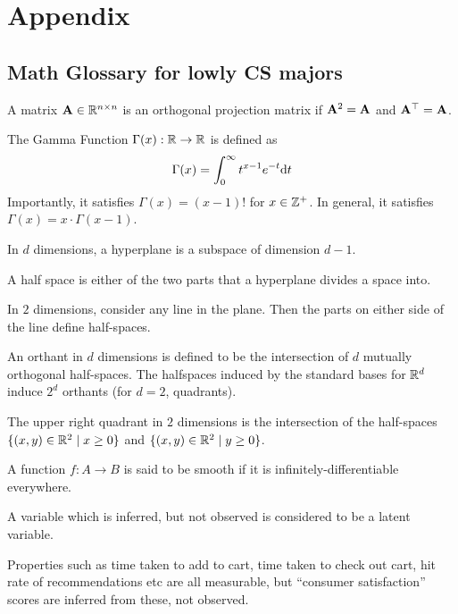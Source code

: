 \section{Appendix}
\subsection{Math Glossary for lowly CS majors}
\begin{defn}
A matrix $\mathbf{A} \in \mathbb{R}^{n \times n}$ is an orthogonal projection matrix if $\mathbf{A}^2 = \mathbf{A}$ and $\mathbf{A}^\top = \mathbf{A}$.
\end{defn}
\begin{defn}
The Gamma Function $\Gamma(x): \mathbb{R} \to \mathbb{R}$ is defined as
\begin{align*}
    \Gamma(x) = \int_0^\infty t^{x-1}e^{-t} {\rm d}t
\end{align*}
Importantly, it satisfies $\Gamma(x) = (x-1)!$ for $x \in \mathbb{Z}^+$. In general, it satisfies $\Gamma(x) = x \cdot \Gamma(x-1)$.
\end{defn}
\begin{defn}[Hyperplane]
In $d$ dimensions, a hyperplane is a subspace of dimension $d-1$.
\end{defn}
\begin{defn}
A half space is either of the two parts that a hyperplane divides a space into.
\end{defn}
\begin{example}
In $2$ dimensions, consider any line in the plane. Then the parts on either side of the line define half-spaces.
\end{example}
\begin{defn}[Orthant]
An orthant in $d$ dimensions is defined to be the intersection of $d$ mutually orthogonal half-spaces. The halfspaces induced by the standard bases for $\mathbb{R}^d$ induce $2^d$ orthants (for $d=2$, quadrants).
\end{defn}
\begin{example}[Orthants]
The upper right quadrant in $2$ dimensions is the intersection of the half-spaces $\{ (x,y) \in \mathbb{R}^2 \mid x \geq 0  \}$ and $\{ (x,y) \in \mathbb{R}^2 \mid y \geq 0 \}$. 
\end{example}
\begin{defn}[Smoothness]
A function $f: A \to B$ is said to be smooth if it is infinitely-differentiable everywhere.
\end{defn}
\begin{defn}[Latent]
A variable which is inferred, but not observed is considered to be a latent variable.
\end{defn}
\begin{example}
Properties such as time taken to add to cart, time taken to check out cart, hit rate of recommendations etc are all measurable, but ``consumer satisfaction'' scores are inferred from these, not observed.
\end{example}
